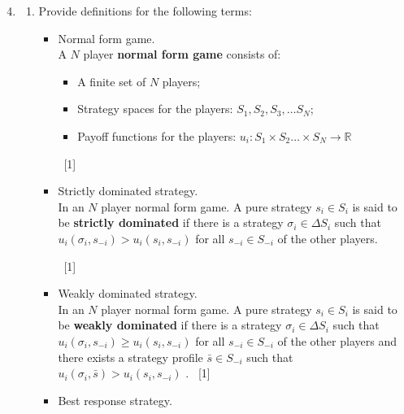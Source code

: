 \documentclass[12pt,a4paper]{article}
\renewcommand{\labelenumi}{\arabic{enumi}} %
\begin{document}
\null \vskip1cm
\begin{enumerate}
\setcounter{enumi}{3}

\renewcommand\labelenumi{\bfseries\theenumi.}

\item

    \begin{enumerate}
        \item Provide definitions for the following terms:
            \begin{itemize}
                \item Normal form game.\\


                A $N$ player \textbf{normal form game} consists of:
                \begin{itemize}
                \item A finite set of $N$ players;
                \item Strategy spaces for the players: $S_1, S_2, S_3, \dots S_N$;
                \item Payoff functions for the players: $u_i:S_{1}\times S_2\dots\times S_N\to \mathbb{R}$
                \end{itemize}

                ~\hfill{[1]}

                \item Strictly dominated strategy.\\

                In an $N$ player normal form game. A pure strategy $s_i\in S_i$ is said to be \textbf{strictly dominated} if there is a strategy $\sigma_i\in \Delta S_i$ such that $u_i(\sigma_i,s_{-i})>u_{i}(s_i,s_{-i})$ for all $s_{-i}\in S_{-i}$ of the other players.

                ~\hfill{[1]}

                \item Weakly dominated strategy.\\

                In an $N$ player normal form game. A pure strategy $s_i\in S_i$ is said to be \textbf{weakly dominated} if there is a strategy $\sigma_i\in \Delta S_i$ such that $u_i(\sigma_i,s_{-i})\geq u_{i}(s_i,s_{-i})$ for all $s_{-i}\in S_{-i}$ of the other players and there exists a strategy profile $\bar s\in S_{-i}$ such that $u_i(\sigma_i,\bar s)> u_{i}(s_i,s_{-i})$ .
                ~\hfill{[1]}

                \item Best response strategy.\\


\end{itemize}
\end{enumerate}
\end{enumerate}
\end{document}
